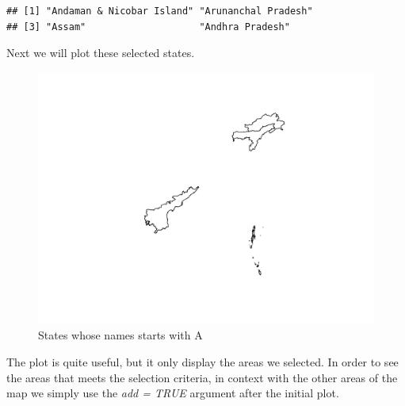 \documentclass[]{article}
\newenvironment{Shaded}{}{}
\newcommand{\CommentTok}[1]{\textcolor[rgb]{0.38,0.63,0.69}{\textit{#1}}}
\newcommand{\KeywordTok}[1]{\textcolor[rgb]{0.00,0.44,0.13}{\textbf{#1}}}
\newcommand{\NormalTok}[1]{#1}
\newcommand{\OperatorTok}[1]{\textcolor[rgb]{0.40,0.40,0.40}{#1}}
\newcommand{\StringTok}[1]{\textcolor[rgb]{0.25,0.44,0.63}{#1}}
\begin{document}
\begin{Shaded}
\end{Shaded}

\begin{verbatim}
## [1] "Andaman & Nicobar Island" "Arunanchal Pradesh"      
## [3] "Assam"                    "Andhra Pradesh"
\end{verbatim}

Next we will plot these selected states.

\begin{Shaded}
\end{Shaded}

\begin{figure}
\centering
\includegraphics{TutorialNotebook_files/figure-latex/unnamed-chunk-8-1.pdf}
\caption{States whose names starts with A}
\end{figure}

The plot is quite useful, but it only display the areas we selected. In
order to see the areas that meets the selection criteria, in context
with the other areas of the map we simply use the \emph{add = TRUE}
argument after the initial plot.
\end{document}
